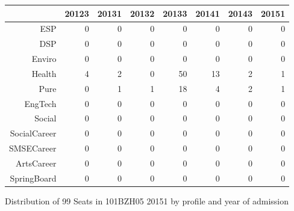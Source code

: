 \documentclass{article}\usepackage[]{graphicx}\usepackage[]{color}
\makeatletter
\newenvironment{kframe}{%
 \def\at@end@of@kframe{}%
 \ifinner\ifhmode%
  \def\at@end@of@kframe{\end{minipage}}%
  \begin{minipage}{\columnwidth}%
 \fi\fi%
 \def\FrameCommand##1{\hskip\@totalleftmargin \hskip-\fboxsep
 \colorbox{shadecolor}{##1}\hskip-\fboxsep
     \hskip-\linewidth \hskip-\@totalleftmargin \hskip\columnwidth}%
 \MakeFramed {\advance\hsize-\width
   \@totalleftmargin\z@ \linewidth\hsize
   \@setminipage}}%
 {\par\unskip\endMakeFramed%
 \at@end@of@kframe}
\makeatother
\begin{document}
\begin{figure}[H]
\centering
\begin{tabular}{rrrrrrrr}
  \hline
 & 20123 & 20131 & 20132 & 20133 & 20141 & 20143 & 20151 \\ 
  \hline
ESP &   0 &   0 &   0 &   0 &   0 &   0 &   0 \\ 
  DSP &   0 &   0 &   0 &   0 &   0 &   0 &   0 \\ 
  Enviro &   0 &   0 &   0 &   0 &   0 &   0 &   0 \\ 
  Health &   4 &   2 &   0 &  50 &  13 &   2 &   1 \\ 
  Pure &   0 &   1 &   1 &  18 &   4 &   2 &   1 \\ 
  EngTech &   0 &   0 &   0 &   0 &   0 &   0 &   0 \\ 
  Social &   0 &   0 &   0 &   0 &   0 &   0 &   0 \\ 
  SocialCareer &   0 &   0 &   0 &   0 &   0 &   0 &   0 \\ 
  SMSECareer &   0 &   0 &   0 &   0 &   0 &   0 &   0 \\ 
  ArtsCareer &   0 &   0 &   0 &   0 &   0 &   0 &   0 \\ 
  SpringBoard &   0 &   0 &   0 &   0 &   0 &   0 &   0 \\ 
   \hline
\end{tabular}
\caption{Distribution of 99 Seats in 101BZH05 20151 by profile and year of admission} 
\end{figure}
\begin{kframe}

{\ttfamily\noindent\bfseries\color{errorcolor}{\#\# Error in characters | factors: operations are possible only for numeric, logical or complex types}}\end{kframe}
\end{document}
